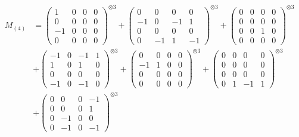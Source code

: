 \documentclass{article}
\newcommand{\Mthree}{%
    M_{(4)}
}
\begin{document}
        \newpage
        
        \footnotesize{
        \begin{align}
        \Mthree
        &= \label{Rs16-Rc11-Solution-17-c1} \begin{pmatrix} 1 & 0 & 0 & 0 \\ 0 & 0 & 0 & 0 \\ -1 & 0 & 0 & 0 \\ 0 & 0 & 0 & 0 \end{pmatrix}^{\otimes 3} 
            + \begin{pmatrix} 0 & 0 & 0 & 0 \\ -1 & 0 & -1 & 1 \\ 0 & 0 & 0 & 0 \\ 0 & -1 & 1 & -1 \end{pmatrix}^{\otimes 3} 
            + \begin{pmatrix} 0 & 0 & 0 & 0 \\ 0 & 0 & 0 & 0 \\ 0 & 0 & 1 & 0 \\ 0 & 0 & 0 & 0 \end{pmatrix}^{\otimes 3} \\
        &+ \label{Rs16-Rc11-Solution-17-c4} \begin{pmatrix} -1 & 0 & -1 & 1 \\ 1 & 0 & 1 & 0 \\ 0 & 0 & 0 & 0 \\ -1 & 0 & -1 & 0 \end{pmatrix}^{\otimes 3} 
            + \begin{pmatrix} 0 & 0 & 0 & 0 \\ -1 & 1 & 0 & 0 \\ 0 & 0 & 0 & 0 \\ 0 & 0 & 0 & 0 \end{pmatrix}^{\otimes 3} 
            + \begin{pmatrix} 0 & 0 & 0 & 0 \\ 0 & 0 & 0 & 0 \\ 0 & 0 & 0 & 0 \\ 0 & 1 & -1 & 1 \end{pmatrix}^{\otimes 3} \\
        &+ \label{Rs16-Rc11-Solution-17-c7} \begin{pmatrix} 0 & 0 & 0 & -1 \\ 0 & 0 & 0 & 1 \\ 0 & -1 & 0 & 0 \\ 0 & -1 & 0 & -1 \end{pmatrix}^{\otimes 3} 

\end{align}}
\end{document}
